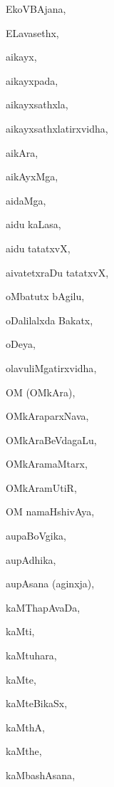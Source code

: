 \begin{multicols}{2}
{EkoVBAjana}, \pageref{EkoVBAjana}

{ELavasethx}, \pageref{ELavasethx}

{aikayx}, \pageref{aikayx}

{aikayxpada}, \pageref{aikayxpada}

{aikayxsathxla}, \pageref{aikayxsathxla}

{aikayxsathxlatirxvidha}, \pageref{aikayxsathxlatirxvidha}

{aikAra}, \pageref{aikAra}

{aikAyxMga}, \pageref{aikAyxMga}

{aidaMga}, \pageref{aidaMga}

{aidu kaLasa}, \pageref{aidu kaLasa}

{aidu tatatxvX}, \pageref{aidu tatatxvX}

{aivatetxraDu tatatxvX}, \pageref{aivatetxraDu tatatxvX}

{oMbatutx bAgilu}, \pageref{oMbatutx bAgilu}

{oDalilalxda Bakatx}, \pageref{oDalilalxda Bakatx}

{oDeya}, \pageref{oDeya}

{olavuliMgatirxvidha}, \pageref{olavuliMgatirxvidha}

{OM (OMkAra)}, \pageref{OM (OMkAra)}

{OMkAraparxNava}, \pageref{OMkAraparxNava}

{OMkAraBeVdagaLu}, \pageref{OMkAraBeVdagaLu}

{OMkAramaMtarx}, \pageref{OMkAramaMtarx}

{OMkAramUtiR}, \pageref{OMkAramUtiR}

{OM namaHshivAya}, \pageref{OM namaHshivAya}

{aupaBoVgika}, \pageref{aupaBoVgika}

{aupAdhika}, \pageref{aupAdhika}

{aupAsana (aginxja)}, \pageref{aupAsana (aginxja)}

{kaMThapAvaDa}, \pageref{kaMThapAvaDa}

{kaMti}, \pageref{kaMti}

{kaMtuhara}, \pageref{kaMtuhara}

{kaMte}, \pageref{kaMte}

{kaMteBikaSx}, \pageref{kaMteBikaSx}

{kaMthA}, \pageref{kaMthA}

{kaMthe}, \pageref{kaMthe}

{kaMbashAsana}, \pageref{kaMbashAsana}


\end{multicols}
